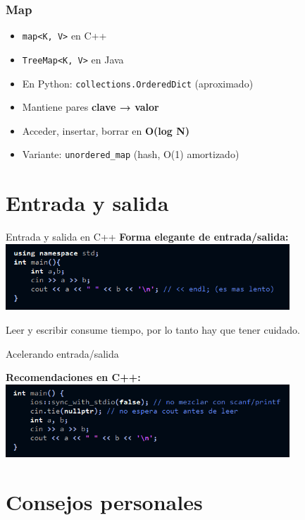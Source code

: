 \documentclass{beamer}
\begin{document}
\begin{frame}
  \frametitle{Map}
  \begin{itemize}
    \item \texttt{map<K, V>} en C++
    \item \texttt{TreeMap<K, V>} en Java
    \item En Python: \texttt{collections.OrderedDict} (aproximado)
    \item Mantiene pares \textbf{clave → valor}
    \item Acceder, insertar, borrar en \textbf{O(log N)}
    \item Variante: \texttt{unordered\_map} (hash, O(1) amortizado)
  \end{itemize}
\end{frame}


\section{Entrada y salida}

\begin{frame}{Entrada y salida en C++}
  \textbf{Forma elegante de entrada/salida:}
  \includegraphics[width=0.8\textwidth,keepaspectratio]{fotos/cin.png}

  \vspace{0.2cm}
  Leer y escribir consume tiempo, por lo tanto hay que tener cuidado.
\end{frame}

\begin{frame}[fragile]{Acelerando entrada/salida}

  \textbf{Recomendaciones en C++:}
  \includegraphics[width=0.8\textwidth,keepaspectratio]{fotos/fastcin.png}
\end{frame}

\section{Consejos personales}
\end{document}
